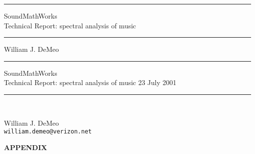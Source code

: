 
\thispagestyle{empty}
\newcommand{\HRule}{\rule{\linewidth}{1mm}}
\setlength{\parindent}{0mm}
\setlength{\parskip}{0mm}

\HRule
  \begin{flushleft}
        \Huge SoundMathWorks \\[5mm]
        \Large Technical Report: \large spectral analysis of music
  \end{flushleft}
\HRule
{}
  \begin{center}
     William J. DeMeo%
  \end{center}

\pagebreak
\vspace*{10mm}
\HRule
  \begin{flushleft}
     \Huge SoundMathWorks\\[5mm]
     \Large Technical Report: 
     \large spectral analysis of music 23 July 2001
  \end{flushleft}
\HRule\\
\begin{center}
William J. DeMeo\\%
{\small {\tt william.demeo@verizon.net}}%
\end{center}
\vspace{10mm}


\tableofcontents
\setlength{\parindent}{5mm}








\pagebreak

\appendix
\begin{center}
{\bf APPENDIX}
\end{center}

% 



\pagebreak



%

% 
%


